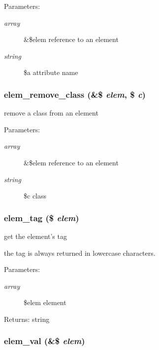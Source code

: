 \begin{Desc}
\item[Parameters:]
\begin{description}
\item[{\em array}]\&\$elem reference to an element \item[{\em string}]\$a attribute name \end{description}
\end{Desc}
\hypertarget{html_8inc_8php_6a224914e8f32176ca11a31154b1ae13}{
\subsubsection[{elem\_\-remove\_\-class}]{\setlength{\rightskip}{0pt plus 5cm}elem\_\-remove\_\-class (\&\$ {\em elem}, \/  \$ {\em c})}}
\label{html_8inc_8php_6a224914e8f32176ca11a31154b1ae13}


remove a class from an element

\begin{Desc}
\item[Parameters:]
\begin{description}
\item[{\em array}]\&\$elem reference to an element \item[{\em string}]\$c class \end{description}
\end{Desc}
\hypertarget{html_8inc_8php_158c5e6dccf734bc8c035e6bcd0a446f}{
\subsubsection[{elem\_\-tag}]{\setlength{\rightskip}{0pt plus 5cm}elem\_\-tag (\$ {\em elem})}}
\label{html_8inc_8php_158c5e6dccf734bc8c035e6bcd0a446f}


get the element's tag

the tag is always returned in lowercase characters. \begin{Desc}
\item[Parameters:]
\begin{description}
\item[{\em array}]\$elem element \end{description}
\end{Desc}
\begin{Desc}
\item[Returns:]string \end{Desc}
\hypertarget{html_8inc_8php_e28d850c3c906c6884462ca89c06f59b}{
\subsubsection[{elem\_\-val}]{\setlength{\rightskip}{0pt plus 5cm}elem\_\-val (\&\$ {\em elem})}}
\label{html_8inc_8php_e28d850c3c906c6884462ca89c06f59b}


